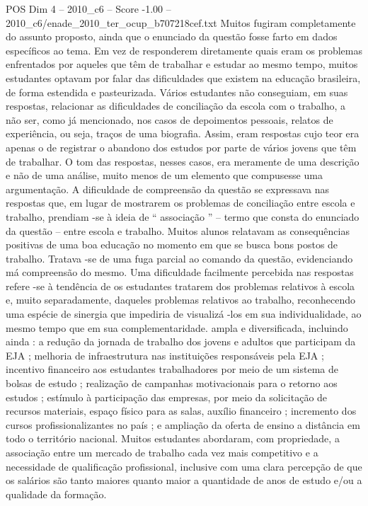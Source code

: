 \begin{textsample}{POS Dim 4 – 2010\_c6 – Score -1.00 – 2010\_c6/enade\_2010\_ter\_ocup\_b707218cef.txt}
Muitos fugiram completamente do assunto proposto, ainda que o enunciado da questão fosse farto em dados específicos ao tema.
Em vez de responderem diretamente quais eram os problemas enfrentados por aqueles que têm de trabalhar e estudar ao mesmo tempo, muitos estudantes optavam por falar das dificuldades que existem na educação brasileira, de forma estendida e pasteurizada.
Vários estudantes não conseguiam, em suas respostas, relacionar as dificuldades de conciliação da escola com o trabalho, a não ser, como já mencionado, nos casos de depoimentos pessoais, relatos de experiência, ou seja, traços de uma biografia.
Assim, eram respostas cujo teor era apenas o de registrar o abandono dos estudos por parte de vários jovens que têm de trabalhar.
O tom das respostas, nesses casos, era meramente de uma descrição e não de uma análise, muito menos de um elemento que compusesse uma argumentação.
A dificuldade de compreensão da questão se expressava nas respostas que, em lugar de mostrarem os problemas de conciliação entre escola e trabalho, prendiam -se à ideia de “ associação ” – termo que consta do enunciado da questão – entre escola e trabalho.
Muitos alunos relatavam as consequências positivas de uma boa educação no momento em que se busca bons postos de trabalho.
Tratava -se de uma fuga parcial ao comando da questão, evidenciando má compreensão do mesmo.
Uma dificuldade facilmente percebida nas respostas refere -se à tendência de os estudantes tratarem dos problemas relativos à escola e, muito separadamente, daqueles problemas relativos ao trabalho, reconhecendo uma espécie de sinergia que impediria de visualizá -los em sua individualidade, ao mesmo tempo que em sua complementaridade. ampla e diversificada, incluindo ainda : a redução da jornada de trabalho dos jovens e adultos que participam da EJA ; melhoria de infraestrutura nas instituições responsáveis pela EJA ; incentivo financeiro aos estudantes trabalhadores por meio de um sistema de bolsas de estudo ; realização de campanhas motivacionais para o retorno aos estudos ; estímulo à participação das empresas, por meio da solicitação de recursos materiais, espaço físico para as salas, auxílio financeiro ; incremento dos cursos profissionalizantes no país ; e ampliação da oferta de ensino a distância em todo o território nacional.
Muitos estudantes abordaram, com propriedade, a associação entre um mercado de trabalho cada vez mais competitivo e a necessidade de qualificação profissional, inclusive com uma clara percepção de que os salários são tanto maiores quanto maior a quantidade de anos de estudo e/ou a qualidade da formação.

\end{textsample}
